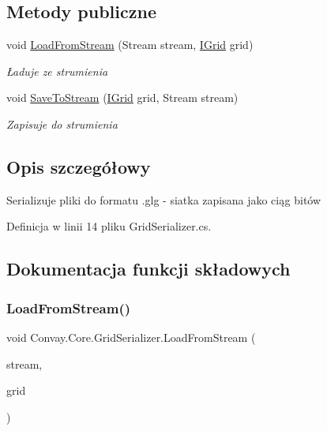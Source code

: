 \subsection*{Metody publiczne}
\begin{DoxyCompactItemize}
\item 
void \hyperlink{class_convay_1_1_core_1_1_grid_serializer_a2df3c14a45db4c5d498cb26ccb3a1529}{Load\+From\+Stream} (Stream stream, \hyperlink{interface_convay_1_1_core_1_1_interfaces_1_1_i_grid}{I\+Grid} grid)
\begin{DoxyCompactList}\small\item\em Ładuje ze strumienia \end{DoxyCompactList}\item 
void \hyperlink{class_convay_1_1_core_1_1_grid_serializer_a3c29cdb004954acf74fb049393786f65}{Save\+To\+Stream} (\hyperlink{interface_convay_1_1_core_1_1_interfaces_1_1_i_grid}{I\+Grid} grid, Stream stream)
\begin{DoxyCompactList}\small\item\em Zapisuje do strumienia \end{DoxyCompactList}\end{DoxyCompactItemize}


\subsection{Opis szczegółowy}
Serializuje pliki do formatu .glg -\/ siatka zapisana jako ciąg bitów 



Definicja w linii 14 pliku Grid\+Serializer.\+cs.



\subsection{Dokumentacja funkcji składowych}
\hypertarget{class_convay_1_1_core_1_1_grid_serializer_a2df3c14a45db4c5d498cb26ccb3a1529}{}\label{class_convay_1_1_core_1_1_grid_serializer_a2df3c14a45db4c5d498cb26ccb3a1529} 
\subsubsection{\texorpdfstring{Load\+From\+Stream()}{LoadFromStream()}}
{\footnotesize\ttfamily void Convay.\+Core.\+Grid\+Serializer.\+Load\+From\+Stream (\begin{DoxyParamCaption}\item[{Stream}]{stream,  }\item[{\hyperlink{interface_convay_1_1_core_1_1_interfaces_1_1_i_grid}{I\+Grid}}]{grid }\end{DoxyParamCaption})}



